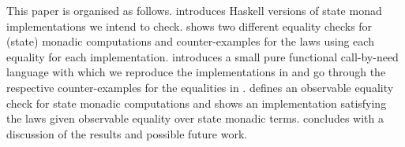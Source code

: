 

This paper is organised as follows.
%
 introduces Haskell versions of state monad
implementations we intend to check.
%
 shows two different equality checks for
(state) monadic computations and counter-examples for the laws using
each equality for each implementation.
%
 introduces a small pure functional call-by-need
language with which we reproduce the implementations in
 and go through the respective counter-examples for
the equalities in .
%
 defines an observable equality check for state
monadic computations and shows an implementation satisfying the laws
given observable equality over state monadic terms.
%
 concludes with a discussion of the results
and possible future work.







